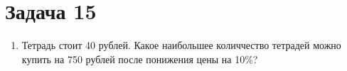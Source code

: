 \chapter{Задача 15}	
\begin{enumerate}
		
	\item Тетрадь стоит 40 рублей. Какое наибольшее количчество тетрадей можно купить на 750 рублей после понижения цены на 10\%?
	
\end{enumerate}